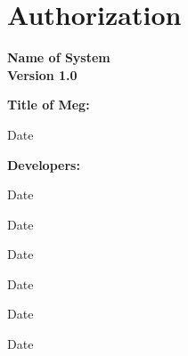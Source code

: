 \section{Authorization}

\begin{center}
\Large\bfseries \textbf{Name of System}\\
Version 1.0
\end{center}

\vspace{0.5cm}

\textbf{Title of Meg:}
\begin{center}
    \signature{Meg }{Date}
\end{center}

\vspace{0.25cm}
\textbf{Developers:}

\signature{Jackson Allfrey}{Date}\hfill\signature{Andrew Beers}{Date}

\signature{Igor Guetten}{Date}\hfill\signature{Mikaela Matias}{Date}


\signature{Richard J Matlock}{Date}\hfill\signature{Junior Smith}{Date}

